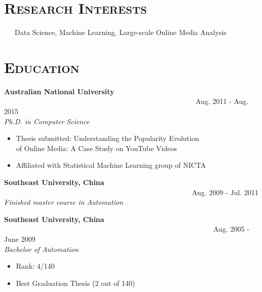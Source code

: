 \begin{resume}




\section{\textsc{Research  Interests}}
\ \ \ Data Science, Machine Learning, Large-scale Online Media Analysis

\section{\textsc{Education}}

\textbf{Australian National University}  \ \  \ \ \ \ \ \ \ \ \ \ \ \ \ \ \ \ \ \ \ \ \ \ \ \ \ \ \ \ \ \ \ \ \ \ \ \ \ \ \ \ \ \ \ \ \ \ \ \ \ \ \ \   Aug. 2011 - Aug. 2015 \\
\emph{Ph.D. in Computer Science} 


\begin{itemize}
\item Thesis submitted: Understanding the Popularity Evolution \\ of Online Media:
  A Case Study on YouTube Videos
  \item Affiliated with Statistical Machine Learning group of NICTA
 \end{itemize}

\textbf{Southeast University, China} \ \ \ \ \ \ \ \ \ \ \ \ \ \ \ \ \ \ \ \ \ \ \ \ \ \ \ \ \ \ \ \ \ \ \ \ \ \ \ \ \ \ \ \ \ \ \ \ \  \ \ \ \   Aug. 2009 - Jul. 2011 \\ 
\emph{Finished master course in Automation}

\textbf{Southeast University, China} \ \ \ \ \ \ \ \ \ \ \ \ \ \ \ \  \ \ \ \ \ \ \ \ \ \ \ \ \ \ \ \ \ \ \ \ \ \ \ \ \ \ \ \ \ \ \  \ \ \ \ \ \ \ \ \ \ \ \ Aug. 2005 - June 2009 \\ 
\emph{Bachelor of Automation} 

 \begin{itemize}
   \item Rank: 4/140
   \item Best Graduation Thesis (2 out of 140)
 \end{itemize}




\end{resume}
